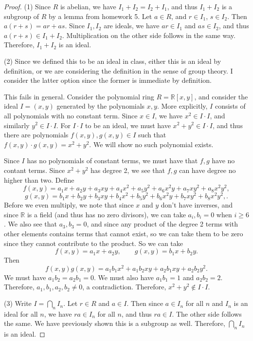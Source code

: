 \documentclass[11pt, letterpaper]{article}
\theoremstyle{plain}
\begin{document}
\begin{proof}
	(1) Since $R$ is abelian, we have $I_1+I_2=I_2+I_1$, and thus $I_1+I_2$ is a subgroup of $R$ by a lemma from homework 5. Let $a\in R$, and $r\in I_1$, $s\in I_2$. Then $a(r+s)=ar+as$. Since $I_1,I_2$ are ideals, we have $ar\in I_1$ and $as\in I_2$, and thus $a(r+s)\in I_1+I_2$. Multiplication on the other side follows in the same way. Therefore, $I_1+I_2$ is an ideal.

	(2) Since we defined this to be an ideal in class, either this is an ideal by definition, or we are considering the definition in the sense of group theory. I consider the latter option since the former is immediate by definition.

	This fails in general. Consider the polynomial ring $R=\mathbb{R} [x,y]$, and consider the ideal $I=( x,y ) $ generated by the polynomials $x,y$. More explicitly, $I$ consists of all polynomials with no constant term. Since $x\in I$, we have $x^2\in I\cdot I$, and similarly $y^2\in I\cdot I$. For $I\cdot I$ to be an ideal, we must have $x^2+y^2\in I\cdot I$, and thus there are polynomials $f(x,y),g(x,y)\in I$ such that $f(x,y)\cdot g(x,y)=x^2+y^2$. We will show no such polynomial exists.

	Since $I$ has no polynomials of constant terms, we must have that $f,g$ have no contant terms. Since $x^2+y^2$ has degree 2, we see that $f,g$ can have degree no higher than two. Define
	\[
		f(x,y)=a_1x + a_2y+a_3xy+a_4x^2+a_5y^2+a_6x^2y+a_7xy^2+a_8x^2y^2,
	\]
	\[
		g(x,y)=b_1x + b_2y+b_3xy+b_4x^2+b_5y^2+b_6x^2y+b_7xy^2+b_8x^2y^2,
	.\]
	Before we even multiply, we note that since $x$ and $y$ don't have inverses, and since $\mathbb{R} $ is a field (and thus has no zero divisors), we can take $a_i,b_i=0$ when $i\geq 6$. We also see that $a_3,b_3=0$, and since any product of the degree 2 terms with other elements contains terms that cannot exist, so we can take them to be zero since they cannot contribute to the product. So we can take
	\[
		f(x,y)=a_1x+a_2y,\qquad g(x,y)=b_1x+b_2y
	.\]
	Then
	\[
		f(x,y)g(x,y)=a_1b_1x^2+a_1b_2xy+a_2b_1xy+a_2b_2y^2
	.\]
	We must have $a_1b_2=a_2b_1=0$. We must also have $a_1b_1=1$ and $a_2b_2=2$. Therefore, $a_1,b_1,a_2,b_2 \neq 0$, a contradiction. Therefore, $x^2+y^2 \notin I\cdot I$.

	(3) Write $I = \bigcap_{n} I_n$. Let $r\in R$ and $a\in I$. Then since $a\in I_n$ for all $n$ and $I_n$ is an ideal for all $n$, we have $ra\in I_n$ for all $n$, and thus $ra\in I$. The other side follows the same. We have previously shown this is a subgroup as well. Therefore, $\bigcap_{n} I_n$ is an ideal.


\end{proof}
\end{document}
